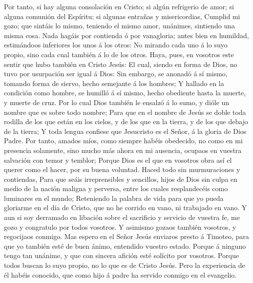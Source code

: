  Por tanto, si hay alguna consolación en Cristo; si algún
refrigerio de amor; si alguna comunión del Espíritu; si algunas entrañas
y misericordias,  Cumplid mi gozo; que sintáis lo mismo,
teniendo el mismo amor, unánimes, sintiendo una misma cosa.
 Nada hagáis por contienda ó por vanagloria; antes bien en
humildad, estimándoos inferiores los unos á los otros:  No
mirando cada uno á lo suyo propio, sino cada cual también á lo de los
otros.  Haya, pues, en vosotros este sentir que hubo
también en Cristo Jesús:  El cual, siendo en forma de
Dios, no tuvo por usurpación ser igual á Dios:  Sin
embargo, se anonadó á sí mismo, tomando forma de siervo, hecho semejante
á los hombres;  Y hallado en la condición como hombre, se
humilló á sí mismo, hecho obediente hasta la muerte, y muerte de cruz.
 Por lo cual Dios también le ensalzó á lo sumo, y dióle un
nombre que es sobre todo nombre;  Para que en el nombre
de Jesús se doble toda rodilla de los que están en los cielos, y de los
que en la tierra, y de los que debajo de la tierra;  Y
toda lengua confiese que Jesucristo es el Señor, á la gloria de Dios
Padre.  Por tanto, amados míos, como siempre habéis
obedecido, no como en mi presencia solamente, sino mucho más ahora en mi
ausencia, ocupaos en vuestra salvación con temor y temblor;
 Porque Dios es el que en vosotros obra así el querer
como el hacer, por su buena voluntad.  Haced todo sin
murmuraciones y contiendas,  Para que seáis
irreprensibles y sencillos, hijos de Dios sin culpa en medio de la
nación maligna y perversa, entre los cuales resplandecéis como luminares
en el mundo;  Reteniendo la palabra de vida para que yo
pueda gloriarme en el día de Cristo, que no he corrido en vano, ni
trabajado en vano.  Y aun si soy derramado en libación
sobre el sacrificio y servicio de vuestra fe, me gozo y congratulo por
todos vosotros.  Y asimismo gozaos también vosotros, y
regocijaos conmigo.  Mas espero en el Señor Jesús
enviaros presto á Timoteo, para que yo también esté de buen ánimo,
entendido vuestro estado.  Porque á ninguno tengo tan
unánime, y que con sincera afición esté solícito por vosotros.
 Porque todos buscan lo suyo propio, no lo que es de
Cristo Jesús.  Pero la experiencia de él habéis conocido,
que como hijo á padre ha servido conmigo en el evangelio.
